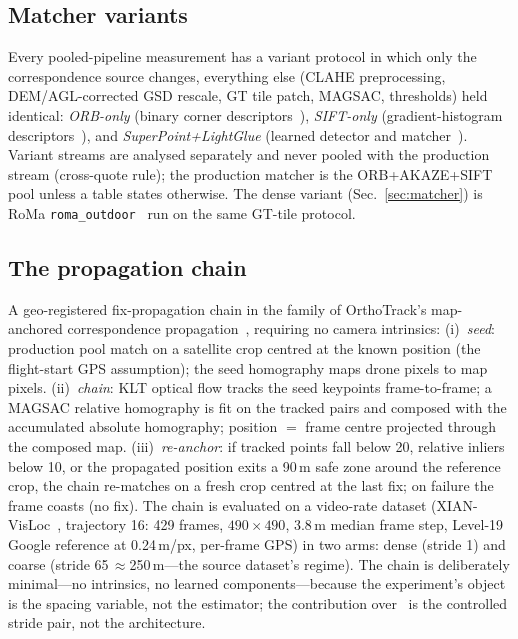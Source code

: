 \documentclass[journal]{IEEEtran}
\begin{document}
\subsection{Matcher variants}
Every pooled-pipeline measurement has a variant protocol in which only the correspondence source changes, everything else (CLAHE preprocessing, DEM/AGL-corrected GSD rescale, GT tile patch, MAGSAC, thresholds) held identical: \emph{ORB-only} (binary corner descriptors~\cite{rublee2011}), \emph{SIFT-only} (gradient-histogram descriptors~\cite{lowe2004}), and \emph{SuperPoint+LightGlue} (learned detector and matcher~\cite{detone2018,sarlin2023}). Variant streams are analysed separately and never pooled with the production stream (cross-quote rule); the production matcher is the ORB+AKAZE+SIFT pool unless a table states otherwise. The dense variant (Sec.~\ref{sec:matcher}) is RoMa \texttt{roma\_outdoor}~\cite{roma} run on the same GT-tile protocol.

\subsection{The propagation chain}
\label{sec:chain}
A geo-registered fix-propagation chain in the family of OrthoTrack's map-anchored correspondence propagation~\cite{orthotrack}, requiring no camera intrinsics: (i)~\emph{seed}: production pool match on a satellite crop centred at the known position (the flight-start GPS assumption); the seed homography maps drone pixels to map pixels. (ii)~\emph{chain}: KLT optical flow tracks the seed keypoints frame-to-frame; a MAGSAC relative homography is fit on the tracked pairs and composed with the accumulated absolute homography; position $=$ frame centre projected through the composed map. (iii)~\emph{re-anchor}: if tracked points fall below 20, relative inliers below 10, or the propagated position exits a 90\,m safe zone around the reference crop, the chain re-matches on a fresh crop centred at the last fix; on failure the frame coasts (no fix). The chain is evaluated on a video-rate dataset (XIAN-VisLoc~\cite{xianvisloc}, trajectory 16: 429 frames, $490\times490$, 3.8\,m median frame step, Level-19 Google reference at 0.24\,m/px, per-frame GPS) in two arms: dense (stride 1) and coarse (stride 65\,$\approx$250\,m---the source dataset's regime). The chain is deliberately minimal---no intrinsics, no learned components---because the experiment's object is the spacing variable, not the estimator; the contribution over~\cite{orthotrack} is the controlled stride pair, not the architecture.
\end{document}
